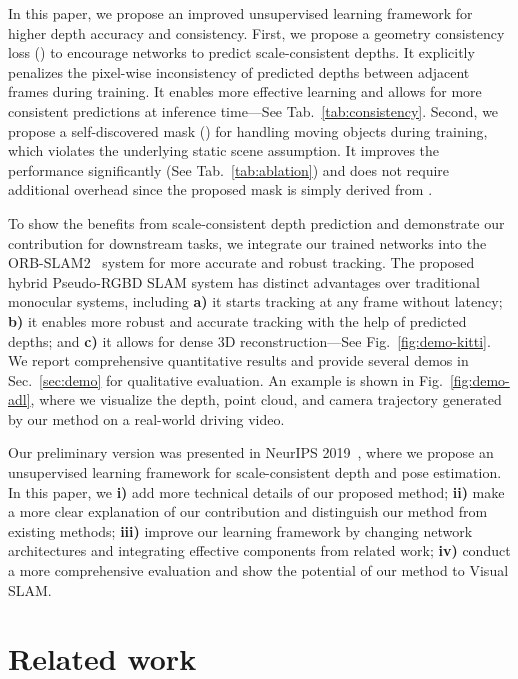 \documentclass[twocolumn]{svjour3}
\renewcommand{\cite}[1]{\textcolor{blue}{\citep{#1}}}
\newcommand{\figref}[1]{Fig.~\ref{#1}}
\newcommand{\tabref}[1]{Tab.~\ref{#1}}
\newcommand{\secref}[1]{Sec.~\ref{#1}}
\begin{document}
In this paper, we propose an improved unsupervised learning framework for higher depth accuracy and consistency.
First, we propose a geometry consistency loss () to encourage networks to predict scale-consistent depths.
It explicitly penalizes the pixel-wise inconsistency of predicted depths between adjacent frames during training.
It enables more effective learning and allows for more consistent predictions at inference time---See \tabref{tab:consistency}.
Second, we propose a self-discovered mask () for handling moving objects during training,
which violates the underlying static scene assumption.
It improves the performance significantly (See \tabref{tab:ablation}) and does not require additional overhead since the proposed mask is simply derived from .

To show the benefits from scale-consistent depth prediction and demonstrate our contribution for downstream tasks,
we integrate our trained networks into the ORB-SLAM2~\cite{murORB2} system for more accurate and robust tracking.
The proposed hybrid Pseudo-RGBD SLAM system has distinct advantages over traditional monocular systems,
including
\textbf{a)} it starts tracking at any frame without latency;
\textbf{b)} it enables more robust and accurate tracking with the help of predicted depths;
and \textbf{c)} it allows for dense 3D reconstruction---See \figref{fig:demo-kitti}.
We report comprehensive quantitative results and provide several demos in \secref{sec:demo} for qualitative evaluation.
An example is shown in \figref{fig:demo-adl},
where we visualize the depth, point cloud, and camera trajectory generated by our method on a real-world driving video.

Our preliminary version was presented in NeurIPS 2019~\cite{bian2019depth},
where we propose an unsupervised learning framework for scale-consistent depth and pose estimation.
In this paper, we \textbf{i)} add more technical details of our proposed method;
\textbf{ii)} make a more clear explanation of our contribution and distinguish our method from existing methods;
\textbf{iii)} improve our learning framework by changing network architectures and integrating effective components from related work;
\textbf{iv)} conduct a more comprehensive evaluation and show the potential of our method to Visual SLAM. 

\section{Related work}
\end{document}
